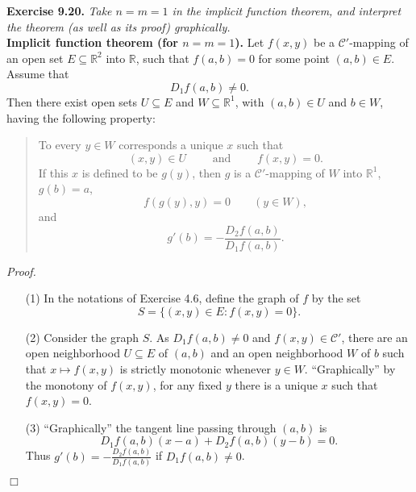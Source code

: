 \documentclass{article}
\begin{document}



\textbf{Exercise 9.20.}
\emph{Take $n=m=1$ in the implicit function theorem,
and interpret the theorem (as well as its proof) graphically.} \\



\textbf{Implicit function theorem (for $n=m=1$).}
  Let $f(x,y)$ be a $\mathscr{C}'$-mapping of
  an open set $E \subseteq \mathbb{R}^2$ into $\mathbb{R}$,
  such that $f(a,b) = 0$ for some point $(a,b) \in E$.
  Assume that
  \[
    D_1 f(a,b) \neq 0.
  \]
  Then there exist open sets $U \subseteq E$ and $W \subseteq \mathbb{R}^1$,
  with $(a,b) \in U$ and $b \in W$, having the following property:
  \begin{quote}
    To every $y \in W$ corresponds a unique $x$ such that
    \[
      (x,y) \in U
      \qquad \text{ and } \qquad
      f(x,y) = 0.
    \]
    If this $x$ is defined to be $g(y)$,
    then $g$ is a $\mathscr{C}'$-mapping of $W$ into $\mathbb{R}^1$,
    $g(b) = a$,
    \[
      f(g(y),y) = 0
      \qquad
      (y \in W),
    \]
    and
    \[
      g'(b) = - \frac{D_2 f(a,b)}{D_1 f(a,b)}.
    \]
  \end{quote}


\emph{Proof.}
\begin{enumerate}
\item[(1)]
In the notations of Exercise 4.6,
define the graph of $f$ by the set
\[
  S = \{ (x,y) \in E : f(x,y) = 0 \}.
\]

\item[(2)]
Consider the graph $S$.
As $D_1 f(a,b) \neq 0$ and $f(x,y) \in \mathscr{C}'$,
there are an open neighborhood $U \subseteq E$ of $(a,b)$
and an open neighborhood $W$ of $b$
such that $x \mapsto f(x,y)$ is strictly monotonic whenever $y \in W$.
``Graphically'' by the monotony of $f(x,y)$, for any fixed $y$
there is a unique $x$ such that $f(x,y) = 0$.

\item[(3)]
``Graphically''
the tangent line passing through $(a,b)$ is
\[
  D_1 f(a,b)(x - a) + D_2 f(a,b)(y - b) = 0.
\]
Thus $g'(b) = -\frac{D_2 f(a,b)}{D_1 f(a,b)}$ if $D_1 f(a,b) \neq 0$.
\end{enumerate}
$\Box$ \\\\



\end{document}

